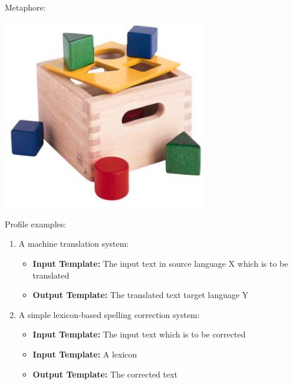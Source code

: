 \documentclass[compress]{beamer}
\begin{document}
\begin{frame}

Metaphore:
\begin{center}
\includegraphics[width=90.0mm]{blokkendoos.jpg}
\end{center}

\end{frame}

\begin{frame}
    \begin{example}
        Profile examples: 
        
        \begin{enumerate}
            \item A machine translation system:
            \begin{itemize}
                \item \textbf{Input Template: } The input text in source language X which is to be translated
                \item \textbf{Output Template: } The translated text target language Y
            \end{itemize}    
            \item A simple lexicon-based spelling correction system:
            \begin{itemize}
                \item \textbf{Input Template: } The input text which is to be corrected
                \item \textbf{Input Template: } A lexicon
                \item \textbf{Output Template: } The corrected text
            \end{itemize}    
        \end{enumerate}
        
    \end{example}
\end{frame}
\end{document}
